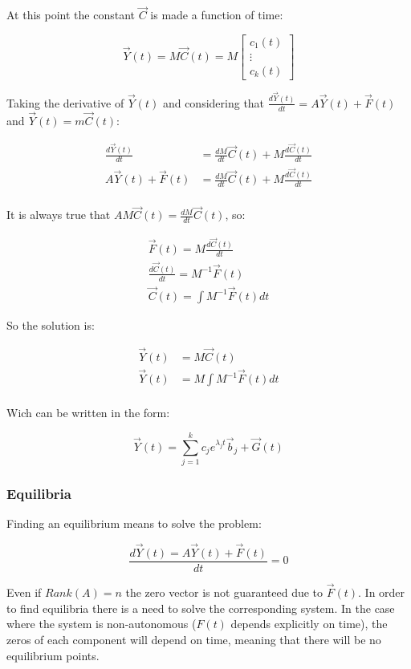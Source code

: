     At this point the constant $\vec{C}$ is made a function of time:

    $$\vec{Y}(t) = M\vec{C}(t) = M\begin{bmatrix}c_1(t)\\\vdots\\c_k(t)\end{bmatrix}$$

    Taking the derivative of $\vec{Y}(t)$ and considering that $\frac{d\vec{Y}(t)}{dt} = A\vec{Y}(t) + \vec{F}(t)$ and $\vec{Y}(t) = m\vec{C}(t)$:

    \begin{align*}
      \frac{d\vec{Y}(t)}{dt}  &= \frac{dM}{dt}\vec{C}(t) + M\frac{d\vec{C}(t)}{dt}\\
      A\vec{Y}(t) + \vec{F}(t) &=\frac{dM}{dt}\vec{C}(t) + M\frac{d\vec{C}(t)}{dt}\\
    \end{align*}

    It is always true that $AM\vec{C}(t) = \frac{dM}{dt}\vec{C}(t)$, so:

    \begin{align*}
      \vec{F}(t) = M\frac{d\vec{C}(t)}{dt}\\
      \frac{d\vec{C}(t)}{dt} = M^{-1}\vec{F}(t)\\
      \vec{C}(t) = \int M^{-1}\vec{F}(t)dt
    \end{align*}

    So the solution is:

    \begin{align*}
      \vec{Y}(t) &= M\vec{C}(t)\\
      \vec{Y}(t) &= M\int M^{-1}\vec{F}(t)dt\\
    \end{align*}

    Wich can be written in the form:

    $$\vec{Y}(t) = \sum\limits_{j=1}^kc_je^{\lambda_jt}\vec{b}_j + \vec{G}(t)$$

    \subsubsection{Equilibria}
    Finding an equilibrium means to solve the problem:

    $$\frac{d\vec{Y}(t) = A\vec{Y}(t) + \vec{F}(t)}{dt} = 0$$

    Even if $Rank(A) = n$ the zero vector is not guaranteed due to $\vec{F}(t)$.
    In order to find equilibria there is a need to solve the corresponding system.
    In the case where the system is non-autonomous ($F(t)$ depends explicitly on time), the zeros of each component will depend on time, meaning that there will be no equilibrium points.

